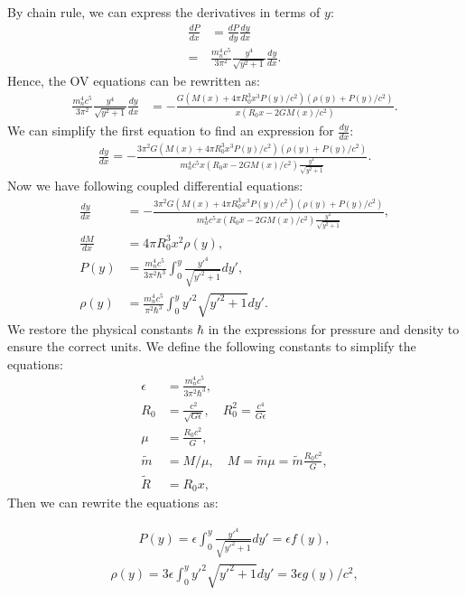 By chain rule, we can express the derivatives in terms of $y$:
\begin{align}
    \frac{dP}{dx} &= \frac{dP}{dy} \frac{dy}{dx}\\
    =& \frac{m_n^4 c^5}{3\pi^2} \frac{y^4}{\sqrt{y^2 + 1}} \frac{dy}{dx}.
\end{align}
Hence, the OV equations can be rewritten as:
\begin{align}
    \frac{m_n^4 c^5}{3\pi^2} \frac{y^4}{\sqrt{y^2 + 1}} \frac{dy}{dx} &= -\frac{G(M(x) + 4\pi R_0^3 x^3 P(y)/c^2)(\rho(y) + P(y)/c^2)}{ x (R_0x - 2GM(x)/c^2)}.
\end{align}
We can simplify the first equation to find an expression for $\frac{dy}{dx}$:
\begin{align}
    \frac{dy}{dx} = -\frac{3\pi^2 G(M(x) + 4\pi R_0^3 x^3 P(y)/c^2)(\rho(y) + P(y)/c^2)}{m_n^4 c^5 x (R_0x - 2GM(x)/c^2) \frac{y^4}{\sqrt{y^2 + 1}}}.
\end{align}
Now we have following coupled differential equations:
\begin{align}
    \frac{dy}{dx} &= -\frac{3\pi^2 G(M(x) + 4\pi R_0^3 x^3 P(y)/c^2)(\rho(y) + P(y)/c^2)}{m_n^4 c^5 x (R_0x - 2GM(x)/c^2) \frac{y^4}{\sqrt{y^2 + 1}}}, \\
    \frac{dM}{dx} &= 4\pi R_0^3 x^2 \rho(y),\\
    P(y) &= \frac{m_n^4 c^5}{3\pi^2\hbar^3} \int_0^{y} \frac{y'^4}{\sqrt{y'^2 + 1}} dy', \\
    \rho(y) &= \frac{m_n^4 c^5}{\pi^2\hbar^3} \int_0^{y} y'^2 \sqrt{y'^2 + 1} dy'.
\end{align}
We restore the physical constants $\hbar$ in the expressions for pressure and density to ensure the correct units. We define the following constants to simplify the equations:
\begin{align}
    \epsilon &= \frac{m_n^4 c^5}{3\pi^2\hbar^3}, \\
    R_0&= \frac{c^2}{\sqrt{G\epsilon}}, \quad R_0^2= \frac{c^4}{G\epsilon} \\
    \mu     &=\frac{R_0 c^2}{G}, \\
    \tilde{m}&=M/\mu, \quad M=\tilde{m} \mu=\tilde{m} \frac{R_0 c^2}{G}, \\
    \tilde{R}&=R_0 x,
\end{align}
Then we can rewrite the equations as:

\begin{align}
    P(y)= \epsilon \int_0^{y} \frac{y'^4}{\sqrt{y'^2 + 1}} dy'= \epsilon f(y),
\end{align}
\begin{align}
    \rho(y) = 3\epsilon \int_0^{y} y'^2 \sqrt{y'^2 + 1} dy'=3\epsilon g(y)/c^2,
\end{align}

